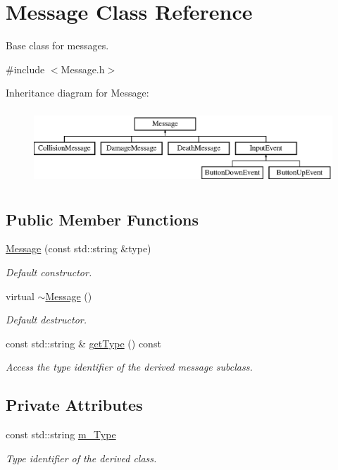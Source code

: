 \hypertarget{class_message}{}\section{Message Class Reference}
\label{class_message}


Base class for messages.  




{\ttfamily \#include $<$Message.\+h$>$}

Inheritance diagram for Message\+:\begin{figure}[H]
\begin{center}
\leavevmode
\includegraphics[height=2.823529cm]{class_message}
\end{center}
\end{figure}
\subsection*{Public Member Functions}
\begin{DoxyCompactItemize}
\item 
\hyperlink{class_message_a3092661fab5b2cca2405372abf68cd91}{Message} (const std\+::string \&type)
\begin{DoxyCompactList}\small\item\em Default constructor. \end{DoxyCompactList}\item 
virtual \hyperlink{class_message_a3f7275462831f787a861271687bcad67}{$\sim$\+Message} ()
\begin{DoxyCompactList}\small\item\em Default destructor. \end{DoxyCompactList}\item 
const std\+::string \& \hyperlink{class_message_af9a175efa065d40d7bc9903f6ba2cc5d}{get\+Type} () const 
\begin{DoxyCompactList}\small\item\em Access the type identifier of the derived message subclass. \end{DoxyCompactList}\end{DoxyCompactItemize}
\subsection*{Private Attributes}
\begin{DoxyCompactItemize}
\item 
const std\+::string \hyperlink{class_message_ae74bd8f969ef873186859fc3a7ad0e41}{m\+\_\+\+Type}
\begin{DoxyCompactList}\small\item\em Type identifier of the derived class. \end{DoxyCompactList}\end{DoxyCompactItemize}


